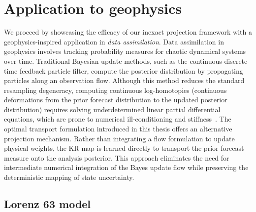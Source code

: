 \section{Application to geophysics} \label{sec:application to geophysics}

We proceed by showcasing the efficacy of our inexact projection framework with a geophysics-inspired application in \emph{data assimilation}. Data assimilation in geophysics involves tracking probability measures for chaotic dynamical systems over time. Traditional Bayesian update methods, such as the continuous-discrete-time feedback particle filter, compute the posterior distribution by propagating particles along an observation flow. Although this method reduces the standard resampling degeneracy, computing continuous log-homotopies (continuous deformations from the prior forecast distribution to the updated posterior distribution) requires solving underdetermined linear partial differential equations, which are prone to numerical ill-conditioning and stiffness~\cite{beeson2024bayesflow}. The optimal transport formulation introduced in this thesis offers an alternative projection mechanism. Rather than integrating a flow formulation to update physical weights, the KR map is learned directly to transport the prior forecast measure onto the analysis posterior. This approach eliminates the need for intermediate numerical integration of the Bayes update flow while preserving the deterministic mapping of state uncertainty.

\subsection{Lorenz 63 model} \label{subsec:lorenz_63}

